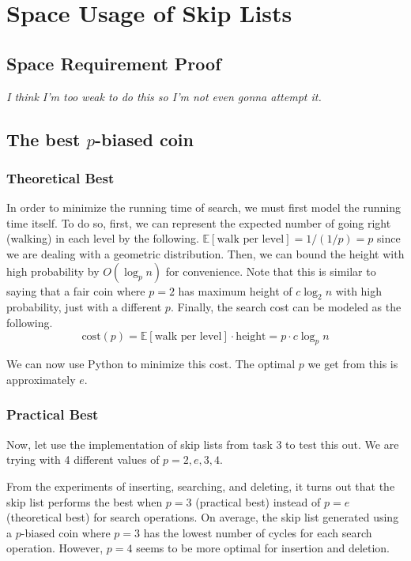 \section{Space Usage of Skip Lists}

\subsection{Space Requirement Proof}

\textit{I think I'm too weak to do this so I'm not even gonna attempt it.}

\subsection{The best $p$-biased coin}

\subsubsection{Theoretical Best}

In order to minimize the running time of search, we must first model the running time itself.
To do so, first, we can represent the expected number of going right (walking) in each level by the following. $ \mathbb{E}[\text{walk per level}] = 1 / (1/p) = p $ since we are dealing with a geometric distribution. Then, we can bound the height with high probability by $O(\log_p n)$ for convenience.
Note that this is similar to saying that a fair coin where $p=2$ has maximum height of $c\log_2 n$ with high probability, just with a different $p$.
Finally, the search cost can be modeled as the following.
\[ \text{cost}(p) = \mathbb{E}[\text{walk per level}] \cdot \text{height} = p \cdot c\log_p n \]

We can now use Python to minimize this cost. The optimal $p$ we get from this is approximately $e$.

\subsubsection{Practical Best}

Now, let use the implementation of skip lists from task 3 to test this out.
We are trying with 4 different values of $p = 2, e, 3, 4$.

From the experiments of inserting, searching, and deleting, it turns out that the skip list performs the best when $p=3$ (practical best) instead of $p = e$ (theoretical best) for search operations. On average, the skip list generated using a $p$-biased coin where $p = 3$ has the lowest number of cycles for each search operation. However, $p=4$ seems to be more optimal for insertion and deletion.

